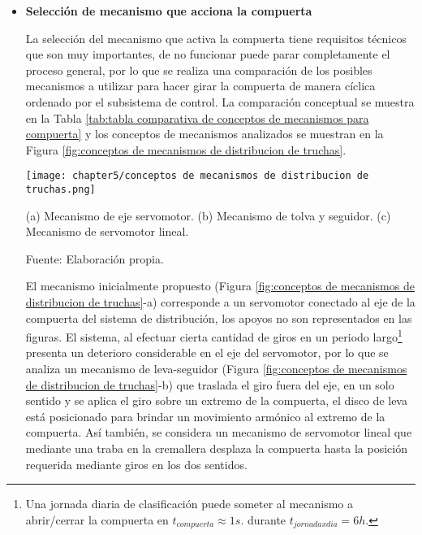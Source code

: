 \begin{itemize}
	
	\item \textbf{Selección de mecanismo que acciona la compuerta}
	
	La selección del mecanismo que activa la compuerta tiene requisitos técnicos que son muy importantes, de no funcionar puede parar completamente el proceso general, por lo que se realiza una comparación de los posibles mecanismos a utilizar para hacer girar la compuerta de manera cíclica ordenado por el subsistema de control. La comparación conceptual se muestra en la Tabla \ref{tab:tabla comparativa de conceptos de mecanismos para compuerta} y los conceptos de mecanismos analizados se muestran en la Figura \ref{fig:conceptos de mecanismos de distribucion de truchas}.
	
	\begin{myfigure}[H]
		\centering
		\texttt{[image: chapter5/conceptos de mecanismos de distribucion de truchas.png]}
		\caption[Conceptos de mecanismos de distribución de truchas]{(a) Mecanismo de eje servomotor. (b) Mecanismo de tolva y seguidor. (c) Mecanismo de servomotor lineal.}
		\begin{myflushleftportland}
			Fuente: Elaboración propia.
		\end{myflushleftportland}
		\label{fig:conceptos de mecanismos de distribucion de truchas}
	\end{myfigure}
	
	El mecanismo inicialmente propuesto (Figura \ref{fig:conceptos de mecanismos de distribucion de truchas}-a) corresponde a un servomotor conectado al eje de la compuerta del sistema de distribución, los apoyos no son representados en las figuras. El sistema, al efectuar cierta cantidad de giros en un periodo largo\footnote{Una jornada diaria de clasificación puede someter al mecanismo a abrir/cerrar la compuerta en $t_{compuerta}\approx1 s.$ durante $t_{jornadaxdia}=6 h.$} presenta un deterioro considerable en el eje del servomotor, por lo que se analiza un mecanismo de leva-seguidor (Figura \ref{fig:conceptos de mecanismos de distribucion de truchas}-b) que traslada el giro fuera del eje, en un solo sentido y se aplica el giro sobre un extremo de la compuerta, el disco de leva está posicionado para brindar un movimiento armónico al extremo de la compuerta. Así también, se considera un mecanismo de servomotor lineal que mediante una traba en la cremallera desplaza la compuerta hasta la posición requerida mediante giros en los dos sentidos.
	

\end{itemize}
